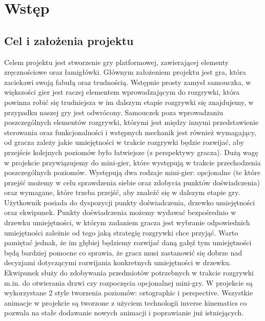 \documentclass[oneside,polski,logo]{amuthesis}
\author{Kamil Tyrek, Mateusz Hypś, Jakub Kozubal}
\date{Poznań, styczeń 2021}
\begin{document}
\maketitle
\makestatement
\tableofcontents
{}



\chapter{Wstęp}
\section{Cel i założenia projektu}
Celem projektu jest stworzenie gry platformowej, zawierającej elementy zręcznościowe oraz łamigłówki. Głównym założeniem projektu jest gra, która zaciekawi swoją fabułą oraz trudnością. Wstępnie prosty zamysł samouczka, w większości gier jest raczej elementem wprowadzającym do rozgrywki, która powinna robić się trudniejsza w im dalszym etapie rozgrywki się znajdujemy, w przypadku naszej gry jest odwrócony. Samouczek poza wprowadzaniu poszczególnych elementów rozgrywki, którymi jest między innymi przedstawienie sterowania oraz funkcjonalności i wstępnych mechanik jest również wymagający, od gracza zależy jakie umiejętności w trakcie rozgrywki będzie rozwijać, aby przejście kolejnych poziomów było łatwiejsze (z perspektywy gracza). Dużą wagę w projekcie przywiązujemy do mini-gier, które występują w trakcie przechodzenia poszczególnych poziomów. Występują dwa rodzaje mini-gier: opcjonalne (te które przejść możemy w celu sprawdzenia siebie oraz zdobycia punktów doświadczenia) oraz wymagane, które trzeba przejść, aby znaleźć się w dalszym etapie gry. Użytkownik posiada do dyspozycji punkty doświadczenia, drzewko umiejętności oraz ekwipunek. Punkty doświadczenia możemy wydawać bezpośrednio w drzewku umiejętności, w którym zadaniem gracza jest wybranie odpowiednich umiejętności zależnie od tego jaką strategię rozgrywki chce przyjąć. Warto pamiętać jednak, że im głębiej będziemy rozwijać daną gałęź tym umiejętności będą bardziej pomocne co sprawia, że gracz musi zastanowić się dobrze nad decyzjami dotyczącymi rozwijania konkretnych umiejętności w drzewku. Ekwipunek służy do zdobywania przedmiotów potrzebnych w trakcie rozgrywki m.in. do otwierania drzwi czy rozpoczęcia opcjonalnej mini-gry. W projekcie są wykorzystane 2 style tworzenia poziomów: ortographic i perspective. Wszystkie animacje w projekcie są tworzone z użyciem technologii inverse kinematics co pozwala na stałe dodawanie nowych animacji i poprawianie już istniejących.
\end{document}
